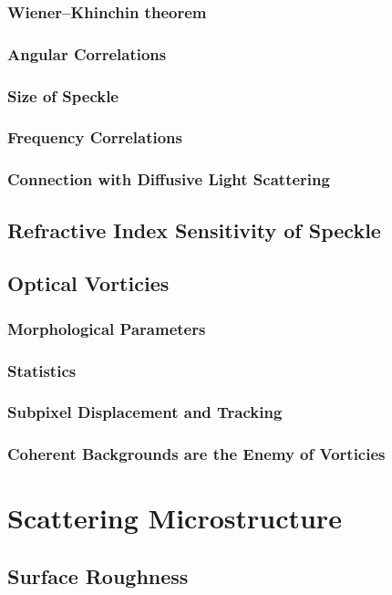 \documentclass[a4paper,titlepage,onecolumn]{report}
\begin{document}
  \subsection{Wiener–Khinchin theorem}
  \subsection{Angular Correlations}
  \subsection{Size of Speckle}
  \subsection{Frequency Correlations}
  \subsection{Connection with Diffusive Light Scattering}
 \section{Refractive Index Sensitivity of Speckle}
 \section{Optical Vorticies}
  \subsection{Morphological Parameters}
  \subsection{Statistics}
  \subsection{Subpixel Displacement and Tracking}
  \subsection{Coherent Backgrounds are the Enemy of Vorticies}

\chapter{Scattering Microstructure} \label{ch:scattmicro}
 \section{Surface Roughness}
\end{document}
